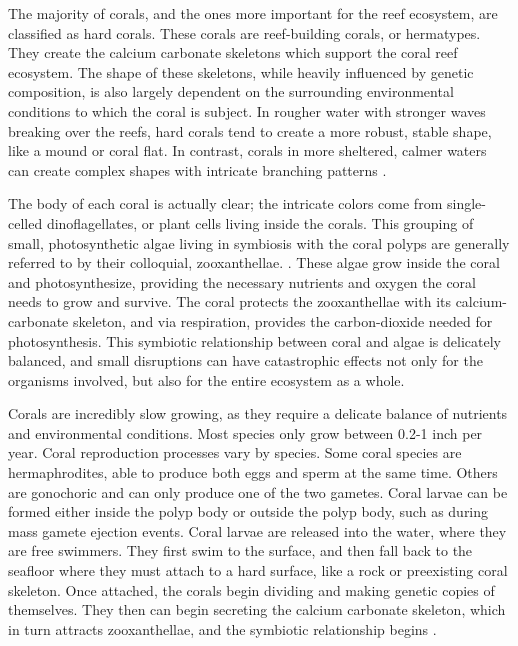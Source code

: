 \documentclass{book}\usepackage{knitr}
\begin{document}
\begin{knitrout}
\begin{kframe}
The majority of corals, and the ones more important for the reef ecosystem, are classified as hard corals. These corals are reef-building corals, or hermatypes. They create the calcium carbonate skeletons which support the coral reef ecosystem. The shape of these skeletons, while heavily influenced by genetic composition, is also largely dependent on the surrounding environmental conditions to which the coral is subject. In rougher water with stronger waves breaking over the reefs, hard corals tend to create a more robust, stable shape, like a mound or coral flat. In contrast, corals in more sheltered, calmer waters can create complex shapes with intricate branching patterns \citep{coralreefalliance_2021}.  

The body of each coral is actually clear; the intricate colors come from single-celled dinoflagellates, or plant cells living inside the corals. This grouping of small, photosynthetic algae living in symbiosis with the coral polyps are generally referred to by their colloquial, zooxanthellae. \citep{noaa}. These algae grow inside the coral and photosynthesize, providing the necessary nutrients and oxygen the coral needs to grow and survive. The coral protects the zooxanthellae with its calcium-carbonate skeleton, and via respiration, provides the carbon-dioxide needed for photosynthesis. This symbiotic relationship between coral and algae is delicately balanced, and small disruptions can have catastrophic effects not only for the organisms involved, but also for the entire ecosystem as a whole. \citep{https://doi.org/10.1002/fee.2088}  

Corals are incredibly slow growing, as they require a delicate balance of nutrients and environmental conditions. Most species only grow between 0.2-1 inch per year. Coral reproduction processes vary by species. Some coral species are hermaphrodites, able to produce both eggs and sperm at the same time. Others are gonochoric and can only produce one of the two gametes. Coral larvae can be formed either inside the polyp body or outside the polyp body, such as during mass gamete ejection events. Coral larvae are released into the water, where they are free swimmers. They first swim to the surface, and then fall back to the seafloor where they must attach to a hard surface, like a rock or preexisting coral skeleton. Once attached, the corals begin dividing and making genetic copies of themselves. They then can begin secreting the calcium carbonate skeleton, which in turn attracts zooxanthellae, and the symbiotic relationship begins \citep{coralreefalliance_2021}.


\end{kframe}
\end{knitrout}
\end{document}
